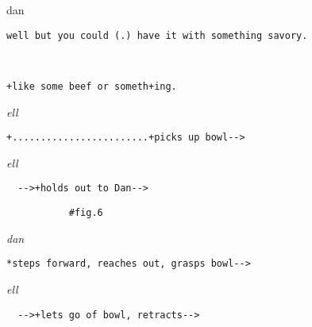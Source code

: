 \documentclass[output=paper,nonflat,modfont,draft]{langsci/langscibook}
\begin{document}

\begin{transbox}{1}{dan}
\begin{verbatim}
well but you could (.) have it with something savory.
\end{verbatim}
\end{transbox}

\begin{transbox}{2}{~}
\begin{verbatim}
+like some beef or someth+ing.
\end{verbatim}
\end{transbox}

\begin{transbox}{3}{\textit{ell}}
\begin{verbatim}
+........................+picks up bowl-->
\end{verbatim}
\end{transbox}


\begin{mdframedkendrick}[style=firstfoc]
\begin{transbox}{5}{\textit{ell}}
\begin{verbatim}
  -->+holds out to Dan-->
\end{verbatim}
\end{transbox}
\end{mdframedkendrick}\vspace{-5mm}

\begin{transbox}{6}{\fig}
\begin{verbatim}
           #fig.6
\end{verbatim}
\end{transbox}


\begin{mdframedkendrick}[style=secondfoc]
\begin{transbox}{8}{\textit{dan}}
\begin{verbatim}
*steps forward, reaches out, grasps bowl-->
\end{verbatim}
\end{transbox}
\end{mdframedkendrick}\vspace{-5mm}


\begin{transbox}{10}{\textit{ell}}
\begin{verbatim}
  -->+lets go of bowl, retracts-->
\end{verbatim}
\end{transbox}
\end{document}
